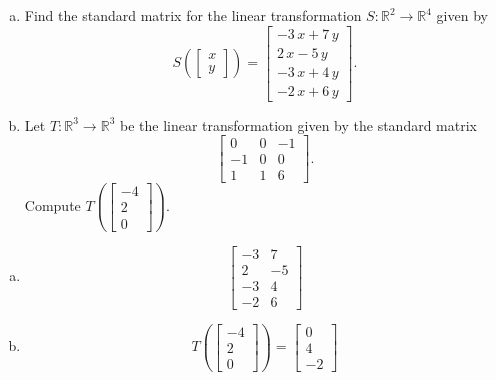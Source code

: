 
\begin{exerciseStatement}

\begin{enumerate}[(a)]
\item Find the standard matrix for the linear transformation \(S:\mathbb{R}^ 2  \to \mathbb{R}^ 4 \) given by \[S\left(  \left[\begin{array}{c}
x \\
y
\end{array}\right]  \right) =  \left[\begin{array}{c}
-3 \, x + 7 \, y \\
2 \, x - 5 \, y \\
-3 \, x + 4 \, y \\
-2 \, x + 6 \, y
\end{array}\right] .\]
\item Let \(T:\mathbb{R}^ 3  \to \mathbb{R}^ 3 \) be the linear transformation given by the standard matrix \[ \left[\begin{array}{ccc}
0 & 0 & -1 \\
-1 & 0 & 0 \\
1 & 1 & 6
\end{array}\right] .\] Compute \(T\left( \left[\begin{array}{c}
-4 \\
2 \\
0
\end{array}\right]  \right)\). 
\end{enumerate}
    
\end{exerciseStatement}
    
\begin{exerciseAnswer} 

\begin{enumerate}[(a)]
\item \[ \left[\begin{array}{cc}
-3 & 7 \\
2 & -5 \\
-3 & 4 \\
-2 & 6
\end{array}\right] \]
\item \[T\left( \left[\begin{array}{c}
-4 \\
2 \\
0
\end{array}\right]  \right)= \left[\begin{array}{c}
0 \\
4 \\
-2
\end{array}\right] \]
\end{enumerate}
    
\end{exerciseAnswer}
    
